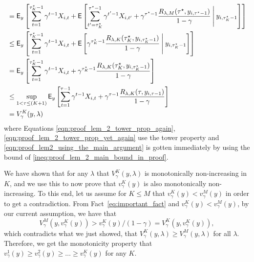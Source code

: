 \begin{myproof}[Proof.]
\begin{align}
	& = \E_{y}\left[\sum_{t=1}^{\tau^\star_K-1}\gamma^{t-1} X_{i,t} + \Ee{\sum_{t'=\tau^\star_K}^{\tau^\star-1}\gamma^{t'-1} X_{i,t'} +  \gamma^{\tau^\star-1}\frac{R_{\lambda,M}(\tau^\star, y_{i,\tau^\star-1})}{1-\gamma} \given[\Bigg] y_{i,\tau^\star_K-1} }\right] \label{eqn:proof_lem_2_tower_prop_again} \\
	& \le  \E_{y}\left[\sum_{t=1}^{\tau^\star_K-1}\gamma^{t-1} X_{i,t} + \Ee{\gamma^{\tau^\star_K-1}  \frac{R_{\lambda,K}(\tau^\star_K, y_{i,\tau^\star_K-1})}{1-\gamma} \given[\Bigg] y_{i,\tau^\star_K-1}}\right] \label{eqn:proof_lem2_using_the_main_argument} \\
	& =  \E_{y}\left[\sum_{t=1}^{\tau^\star_K-1}\gamma^{t-1} X_{i,t} +  \gamma^{\tau^\star_K-1}  \frac{R_{\lambda,K}(\tau^\star_K, y_{i,\tau^\star_K-1})}{1-\gamma}\right] \label{eqn:proof_lem_2_tower_prop_yet_again} \\
	& \le \sup_{1 < \tau \le (K+1)}  \E_{y}\left[\sum_{t=1}^{\tau-1}\gamma^{t-1} X_{i,t} +  \gamma^{\tau-1}  \frac{R_{\lambda,K}(\tau, y_{i,\tau-1})}{1-\gamma}\right] \nonumber \\
	& = V^K_{\gamma}(y, \lambda)
	\end{align}
	where Equations \eqref{eqn:proof_lem_2_tower_prop_again}, \eqref{eqn:proof_lem_2_tower_prop_yet_again} use the tower property and \eqref{eqn:proof_lem2_using_the_main_argument} is gotten immediately by using the bound of \eqref{ineq:proof_lem_2_main_bound_in_proof}.
	
	We have shown that for any $\lambda$  that $V^K_\gamma(y, \lambda)$ is monotonically non-increasing in $K$, and we use this to now prove that $v^K_\gamma(y)$ is also monotonically non-increasing. To this end, let us assume for $K \le M$ that $v^K_\gamma(y) < v^M_\gamma(y)$ in order to get a contradiction. From Fact~\eqref{eq:important_fact} and $v^K_\gamma(y) < v^M_\gamma(y)$, by our current assumption, we have that 
	\begin{equation}
		V^M_\gamma(y, v^K_\gamma(y)) > v^K_\gamma(y)/(1-\gamma) = V^K_\gamma(y, v^K_\gamma(y)),
	\end{equation}
	which contradicts what we just showed, that $V^K_{\gamma}( y, \lambda) \ge V^M_{\gamma}(y, \lambda)$ for all $\lambda$. Therefore, we get the monotonicity property that $v^1_\gamma(y) \geq v^2_\gamma(y) \geq \ldots \geq v^K_\gamma(y)$ for any $K$.
	

\end{myproof}
